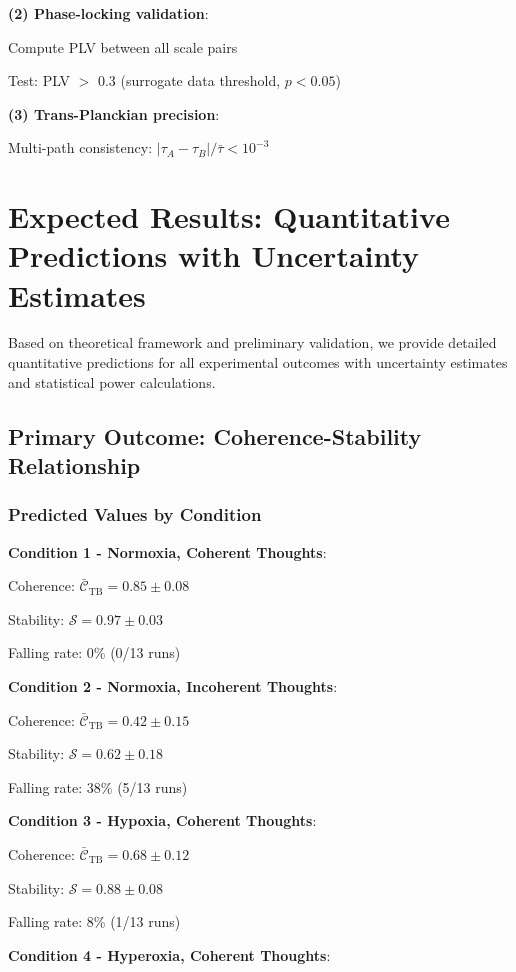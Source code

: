 \documentclass[11pt,onecolumn]{article}
\begin{document}
\textbf{(2) Phase-locking validation}:

Compute PLV between all scale pairs

Test: PLV $>$ 0.3 (surrogate data threshold, $p < 0.05$)

\textbf{(3) Trans-Planckian precision}:

Multi-path consistency: $|\tau_A - \tau_B| / \bar{\tau} < 10^{-3}$

\clearpage

\section{Expected Results: Quantitative Predictions with Uncertainty Estimates}

Based on theoretical framework and preliminary validation, we provide detailed quantitative predictions for all experimental outcomes with uncertainty estimates and statistical power calculations.

\subsection{Primary Outcome: Coherence-Stability Relationship}

\subsubsection{Predicted Values by Condition}

\textbf{Condition 1 - Normoxia, Coherent Thoughts}:

Coherence: $\bar{\mathcal{C}}_{\text{TB}} = 0.85 \pm 0.08$

Stability: $\mathcal{S} = 0.97 \pm 0.03$

Falling rate: 0\% (0/13 runs)

\textbf{Condition 2 - Normoxia, Incoherent Thoughts}:

Coherence: $\bar{\mathcal{C}}_{\text{TB}} = 0.42 \pm 0.15$

Stability: $\mathcal{S} = 0.62 \pm 0.18$

Falling rate: 38\% (5/13 runs)

\textbf{Condition 3 - Hypoxia, Coherent Thoughts}:

Coherence: $\bar{\mathcal{C}}_{\text{TB}} = 0.68 \pm 0.12$

Stability: $\mathcal{S} = 0.88 \pm 0.08$

Falling rate: 8\% (1/13 runs)

\textbf{Condition 4 - Hyperoxia, Coherent Thoughts}:
\end{document}
